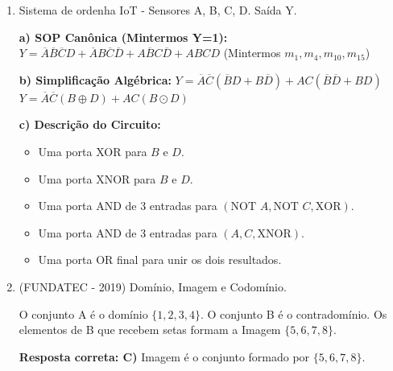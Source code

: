 \documentclass[12pt,a4paper]{article}
\begin{document}
\begin{enumerate}
    \begin{respostabox}
    \textbf{Resposta correta: B)} Apenas as afirmações I e II estão corretas.
    \end{respostabox}

    \item Sistema de ordenha IoT - Sensores A, B, C, D. Saída Y.
    
    \begin{respostabox}
    \textbf{a) SOP Canônica (Mintermos Y=1):}
    $Y = \overline{A}\overline{B}\overline{C}D + \overline{A}B\overline{C}\overline{D} + A\overline{B}C\overline{D} + ABCD$ (Mintermos $m_1, m_4, m_{10}, m_{15}$)
    
    \textbf{b) Simplificação Algébrica:}
    $Y = \overline{A}\overline{C}(\overline{B}D + B\overline{D}) + AC(\overline{B}\overline{D} + BD)$
    $Y = \overline{A}\overline{C}(B \oplus D) + AC(B \odot D)$
    
    \textbf{c) Descrição do Circuito:}
    \begin{itemize}
        \item Uma porta XOR para $B$ e $D$.
        \item Uma porta XNOR para $B$ e $D$.
        \item Uma porta AND de 3 entradas para $(\text{NOT } A, \text{NOT } C, \text{XOR})$.
        \item Uma porta AND de 3 entradas para $(A, C, \text{XNOR})$.
        \item Uma porta OR final para unir os dois resultados.
    \end{itemize}
    \end{respostabox}

    \item (FUNDATEC - 2019) Domínio, Imagem e Codomínio.
    \begin{respostabox}
    O conjunto A é o domínio $\{1, 2, 3, 4\}$. O conjunto B é o contradomínio. Os elementos de B que recebem setas formam a Imagem $\{5, 6, 7, 8\}$.
    
    \textbf{Resposta correta: C)} Imagem é o conjunto formado por $\{5, 6, 7, 8\}$.
    \end{respostabox}


\end{enumerate}
\end{document}

